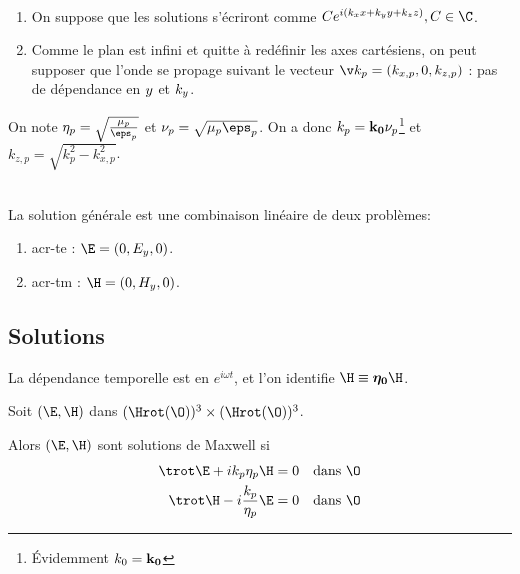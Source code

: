 \begin{hyp}{}~\\
    \begin{enumerate}
      \item On suppose que les solutions s'écriront comme $Ce^{i(k_\x\x +k_\y\y+k_\z\z)}, C\in\C$.
      \item Comme le plan est infini et quitte à redéfinir les axes cartésiens, on peut supposer que l'onde se propage suivant le vecteur $\v k_p = (k_{\x,p},0,k_{\z,p})$ : pas de dépendance en ${y}$ et $k_{y}$.
    \end{enumerate}
\end{hyp}

On note $\eta_p = \sqrt{\frac{\mu_p}{\eps_p}}$ et $\nu_p = \sqrt{\mu_p \eps_p}$.
On a donc $k_p = \mathbf{k_0}\nu_p$\footnote{Évidemment $k_0 = \mathbf{k_0}$} et $k_{z,p} = \sqrt{k_p^2 - k_{x,p}^2}$.

\begin{hyp}{}~\\
La solution générale est une combinaison linéaire de deux problèmes: 
\begin{enumerate}
  \item \gls{acr-te} : $\E = (0,E_y,0)$.
  \item \gls{acr-tm} : $\H = (0,H_y,0)$. 
\end{enumerate}
\end{hyp}

\subsection{Solutions}

\begin{tcolorbox}
\centering
La dépendance temporelle est en $e^{i \omega t}$, et l'on identifie $\H \equiv \etaO \H$.
\end{tcolorbox}


Soit $(\E,\H)$ dans $(\Hrot(\O))^3 \times (\Hrot(\O))^3$. 

Alors $(\E,\H)$ sont solutions de Maxwell si 
\begin{align}
  \label{eq:coeffs_ref:maxwell-E}
  \trot \E + i k_p \eta_p \H &= 0 && \text{dans $\O$}\\
  \label{eq:coeffs_ref:maxwell-H}
  \trot \H - i \frac{k_p}{\eta_p} \E &= 0 && \text{dans $\O$}
\end{align}

